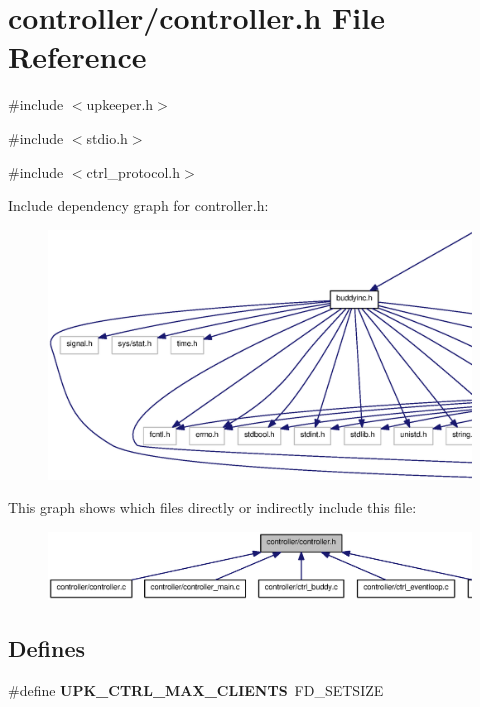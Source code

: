 \section{controller/controller.h File Reference}
\label{controller_8h}
{\ttfamily \#include $<$upkeeper.h$>$}\par
{\ttfamily \#include $<$stdio.h$>$}\par
{\ttfamily \#include $<$ctrl\_\-protocol.h$>$}\par
Include dependency graph for controller.h:
\nopagebreak
\begin{figure}[H]
\begin{center}
\leavevmode
\includegraphics[width=400pt]{controller_8h__incl}
\end{center}
\end{figure}
This graph shows which files directly or indirectly include this file:\nopagebreak
\begin{figure}[H]
\begin{center}
\leavevmode
\includegraphics[width=400pt]{controller_8h__dep__incl}
\end{center}
\end{figure}
\subsection*{Defines}
\begin{DoxyCompactItemize}
\item 
\#define {\bf UPK\_\-CTRL\_\-MAX\_\-CLIENTS}~FD\_\-SETSIZE
\end{DoxyCompactItemize}
